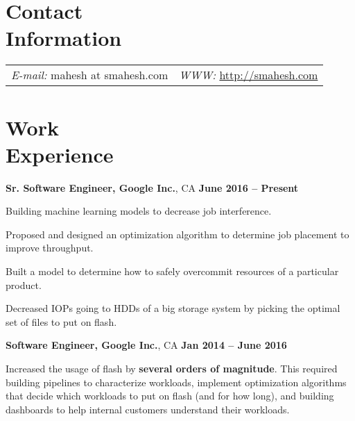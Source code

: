 \documentclass[margin,line]{resume}
\begin{document}
\begin{resume}


\section{\mysidestyle Contact\\Information}


\begin{tabular}{@{}p{4in}p{5in}}
{\it E-mail:}  mahesh at smahesh.com &  {\it WWW:} \href{http://datahacker.me}{http://smahesh.com}\\
\end{tabular}

    \section{\mysidestyle Work\\Experience}
    \textbf{Sr. Software Engineer, Google Inc.}, CA \hfill \textbf{ June 2016 -- Present}\vspace{-3mm}\\\vspace{-1mm}
    \begin{list2}
      \item Building machine learning models to decrease job interference.
      \item Proposed and designed an optimization algorithm to determine job placement to improve throughput.
      \item Built a model to determine how to safely overcommit resources of a particular product.
      \item Decreased IOPs going to HDDs of a big storage system by picking the optimal set of files to put on flash.
    \end{list2}

    \textbf{Software Engineer, Google Inc.}, CA \hfill \textbf{ Jan 2014 -- June 2016}\vspace{-3mm}\\\vspace{-1mm}
    \begin{list2}
    \item Increased the usage of flash by \textbf{several orders of magnitude}. This required building pipelines to characterize workloads, implement optimization algorithms that decide which workloads to put on flash (and for how long), and building dashboards to help internal customers understand their workloads.
    \end{list2}

\end{resume}
\end{document}
